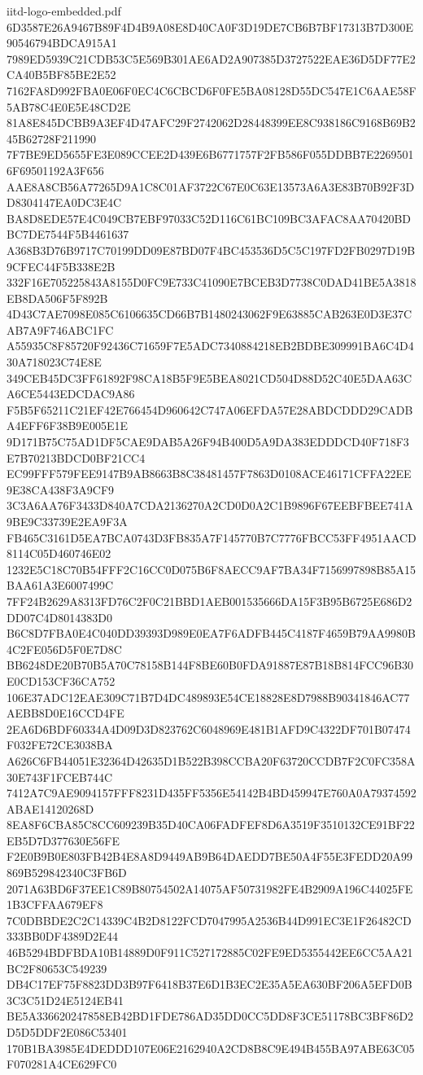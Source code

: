 \begin{filecontents*}[overwrite]{iitd-logo-embedded.pdf}
6D3587E26A9467B89F4D4B9A08E8D40CA0F3D19DE7CB6B7BF17313B7D300E90546794BDCA915A1
7989ED5939C21CDB53C5E569B301AE6AD2A907385D3727522EAE36D5DF77E2CA40B5BF85BE2E52
7162FA8D992FBA0E06F0EC4C6CBCD6F0FE5BA08128D55DC547E1C6AAE58F5AB78C4E0E5E48CD2E
81A8E845DCBB9A3EF4D47AFC29F2742062D28448399EE8C938186C9168B69B245B62728F211990
7F7BE9ED5655FE3E089CCEE2D439E6B6771757F2FB586F055DDBB7E22695016F69501192A3F656
AAE8A8CB56A77265D9A1C8C01AF3722C67E0C63E13573A6A3E83B70B92F3DD8304147EA0DC3E4C
BA8D8EDE57E4C049CB7EBF97033C52D116C61BC109BC3AFAC8AA70420BDBC7DE7544F5B4461637
A368B3D76B9717C70199DD09E87BD07F4BC453536D5C5C197FD2FB0297D19B9CFEC44F5B338E2B
332F16E705225843A8155D0FC9E733C41090E7BCEB3D7738C0DAD41BE5A3818EB8DA506F5F892B
4D43C7AE7098E085C6106635CD66B7B1480243062F9E63885CAB263E0D3E37CAB7A9F746ABC1FC
A55935C8F85720F92436C71659F7E5ADC7340884218EB2BDBE309991BA6C4D430A718023C74E8E
349CEB45DC3FF61892F98CA18B5F9E5BEA8021CD504D88D52C40E5DAA63CA6CE5443EDCDAC9A86
F5B5F65211C21EF42E766454D960642C747A06EFDA57E28ABDCDDD29CADBA4EFF6F38B9E005E1E
9D171B75C75AD1DF5CAE9DAB5A26F94B400D5A9DA383EDDDCD40F718F3E7B70213BDCD0BF21CC4
EC99FFF579FEE9147B9AB8663B8C38481457F7863D0108ACE46171CFFA22EE9E38CA438F3A9CF9
3C3A6AA76F3433D840A7CDA2136270A2CD0D0A2C1B9896F67EEBFBEE741A9BE9C33739E2EA9F3A
FB465C3161D5EA7BCA0743D3FB835A7F145770B7C7776FBCC53FF4951AACD8114C05D460746E02
1232E5C18C70B54FFF2C16CC0D075B6F8AECC9AF7BA34F7156997898B85A15BAA61A3E6007499C
7FF24B2629A8313FD76C2F0C21BBD1AEB001535666DA15F3B95B6725E686D2DD07C4D8014383D0
B6C8D7FBA0E4C040DD39393D989E0EA7F6ADFB445C4187F4659B79AA9980B4C2FE056D5F0E7D8C
BB6248DE20B70B5A70C78158B144F8BE60B0FDA91887E87B18B814FCC96B30E0CD153CF36CA752
106E37ADC12EAE309C71B7D4DC489893E54CE18828E8D7988B90341846AC77AEBB8D0E16CCD4FE
2EA6D6BDF60334A4D09D3D823762C6048969E481B1AFD9C4322DF701B07474F032FE72CE3038BA
A626C6FB44051E32364D42635D1B522B398CCBA20F63720CCDB7F2C0FC358A30E743F1FCEB744C
7412A7C9AE9094157FFF8231D435FF5356E54142B4BD459947E760A0A79374592ABAE14120268D
8EA8F6CBA85C8CC609239B35D40CA06FADFEF8D6A3519F3510132CE91BF22EB5D7D377630E56FE
F2E0B9B0E803FB42B4E8A8D9449AB9B64DAEDD7BE50A4F55E3FEDD20A99869B529842340C3FB6D
2071A63BD6F37EE1C89B80754502A14075AF50731982FE4B2909A196C44025FE1B3CFFAA679EF8
7C0DBBDE2C2C14339C4B2D8122FCD7047995A2536B44D991EC3E1F26482CD333BB0DF4389D2E44
46B5294BDFBDA10B14889D0F911C527172885C02FE9ED5355442EE6CC5AA21BC2F80653C549239
DB4C17EF75F8823DD3B97F6418B37E6D1B3EC2E35A5EA630BF206A5EFD0B3C3C51D24E5124EB41
BE5A336620247858EB42BD1FDE786AD35DD0CC5DD8F3CE51178BC3BF86D2D5D5DDF2E086C53401
170B1BA3985E4DEDDD107E06E2162940A2CD8B8C9E494B455BA97ABE63C05F070281A4CE629FC0

\end{filecontents*}
